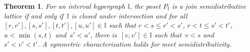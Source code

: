 \documentclass{amsart}
\newtheorem{theoremA}{Theorem}
\theoremstyle{definition}
\newcommand{\II}{\mathbb I} %
\begin{document}
\begin{theoremA}
\label{thm:semidistributiveLatticeI}
%
%
For an interval hypergraph $\II$, the poset $P_\II$ is a join semidistributive lattice if and only if~$\II$ is closed under intersection and
for all~$[r,r'], [s,s'], [t,t'], [u,u'] \in \II$ such that ${r < s \le r' < s'}$, $r < t \le s' < t'$, $u < \min(s, t)$ and~$s' < u'$, there is~$[v,v'] \in \II$ such that~$v < s$ and~${s' < v' < t'}$.
A symmetric characterization holds for meet semidistributivity.
\end{theoremA}
\end{document}
